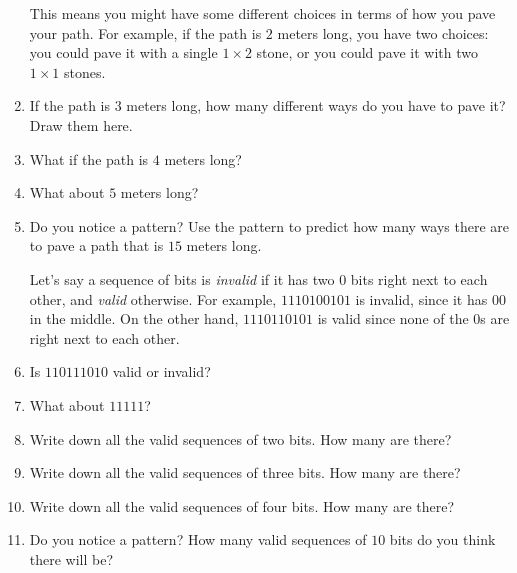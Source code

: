 \documentclass{article}
\begin{document}
\begin{enumerate}
    This means you might have some different
    choices in terms of how you pave your path.  For example, if the
    path is $2$ meters long, you have two choices: you could pave it
    with a single $1 \times 2$ stone, or you could pave it with two
    $1\times 1$ stones.

    \begin{center}
    \end{center}
\newpage
\item If the path is $3$ meters long, how many different ways do you
  have to pave it?  Draw them here. \vspace{2in}

\item What if the path is $4$ meters long? \newpage

\item What about $5$ meters long? \vspace{3in}

\item Do you notice a pattern?  Use the pattern to predict how many
  ways there are to pave a path that is $15$ meters long.

  \newpage

Let's say a sequence of bits is \emph{invalid} if it has two $0$ bits
right next to each other, and \emph{valid} otherwise.  For example,
$1110100101$ is invalid, since it has $00$ in the middle.  On the
other hand, $1110110101$ is valid since none of the $0$s are right
next to each other.

\item Is $110111010$ valid or invalid? \vspace{1in}
\item What about $11111$? \vspace{1in}
\item Write down all the valid sequences of two bits.  How many are there? \vspace{2.5in}
\item Write down all the valid sequences of three bits.  How many are
  there? \vspace{2in}
\item Write down all the valid sequences of four bits.  How many are
  there? \vspace{2in}
\item Do you notice a pattern?  How many valid sequences of $10$ bits
  do you think there will be?

  \newpage

\end{enumerate}
\end{document}
